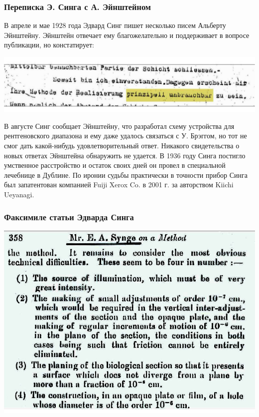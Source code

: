 \documentclass[9pt, compress, xcolor=table]{beamer}
\begin{document}
\begin{frame}[fragile]
\frametitle{Переписка Э. Синга с А. Эйнштейном }

В апреле и мае 1928 года Эдвард Синг пишет несколько писем Альберту Эйнштейну. Эйнштейн отвечает
ему благожелательно и поддерживает в вопросе публикации, но констатирует:
\begin{center}
\includegraphics[scale=0.3]{eins}
\end{center}
В августе Синг сообщает Эйнштейну, что разработал схему устройства для рентгеновского диапазона и
ему даже удалось связаться с У. Брэггом, но тот не смог дать какой-нибудь удовлетворительный ответ.
Никакого свидетельства о новых ответах Эйнштейна обнаружить не удается. В 1936 году Синга постигло
умственное расстройство и остаток своих дней он провел в специальной лечебнице в Дублине. По иронии судьбы практически в точности прибор Синга был запатентован компанией Fuiji Xerox Co. в 2001 г. за авторством Kiichi Ueyanagi.

\end{frame}

\begin{frame}[fragile]
\frametitle{Факсимиле статьи Эдварда Синга}

\begin{center}
\includegraphics[scale=0.4]{synge}
\end{center}

\end{frame}
\end{document}
